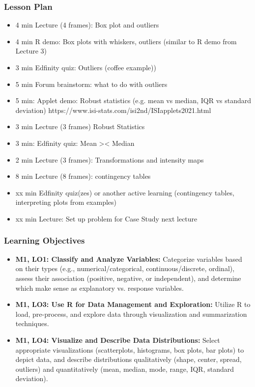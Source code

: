 \begin{frame}
    \frametitle{Lesson Plan}
    \begin{itemize}
        \item 4 min Lecture (4 frames): Box plot and outliers
        \item 4 min R demo: Box plots with whiskers, outliers (similar to R demo from Lecture 3)
        \item 3 min Edfinity quiz: Outliers (coffee example))
        \item 5 min Forum brainstorm: what to do with outliers
        \item 5 min: Applet demo: Robust statistics (e.g. mean vs median, IQR vs standard deviation) https://www.isi-stats.com/isi2nd/ISIapplets2021.html
        \item 3 min Lecture (3 frames) Robust Statistics 
        \item 3 min: Edfinity quiz: Mean >< Median
        \item 2 min Lecture (3 frames): Transformations and intensity maps
        \item 8 min Lecture (8 frames): contingency tables
        \item xx min Edfinity quiz(zes) or another active learning (contingency tables, interpreting plots from examples)
        \item xx min Lecture: Set up problem for Case Study next lecture
    \end{itemize}
\end{frame}

\begin{frame}
    \frametitle{Learning Objectives}
    \begin{itemize}
        \item \textbf{M1, LO1: Classify and Analyze Variables:} Categorize variables based on their types (e.g., numerical/categorical, continuous/discrete, ordinal), assess their association (positive, negative, or independent), and determine which make sense as explanatory vs. response variables.
        \item \textbf{M1, LO3: Use R for Data Management and Exploration:} Utilize R to load, pre-process, and explore data through visualization and summarization techniques.
        \item \textbf{M1, LO4: Visualize and Describe Data Distributions:} Select appropriate visualizations (scatterplots, histograms, box plots, bar plots) to depict data, and describe distributions qualitatively (shape, center, spread, outliers) and quantitatively (mean, median, mode, range, IQR, standard deviation).
    \end{itemize}
\end{frame}

